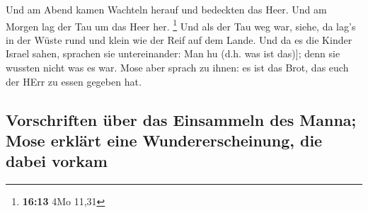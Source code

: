  Und am Abend kamen Wachteln herauf und bedeckten das
Heer. Und am Morgen lag der Tau um das Heer her. \footnote{\textbf{16:13}
  4Mo 11,31}  Und als der Tau weg war, siehe, da lag's in
der Wüste rund und klein wie der Reif auf dem Lande.  Und
da es die Kinder Israel sahen, sprachen sie untereinander: Man hu (d.h.
was ist das){]}; denn sie wussten nicht was es war. Mose aber sprach zu
ihnen: es ist das Brot, das euch der HErr zu essen gegeben hat.

\hypertarget{vorschriften-uxfcber-das-einsammeln-des-manna-mose-erkluxe4rt-eine-wundererscheinung-die-dabei-vorkam}{%
\subsection{Vorschriften über das Einsammeln des Manna; Mose erklärt
eine Wundererscheinung, die dabei
vorkam}\label{vorschriften-uxfcber-das-einsammeln-des-manna-mose-erkluxe4rt-eine-wundererscheinung-die-dabei-vorkam}}

